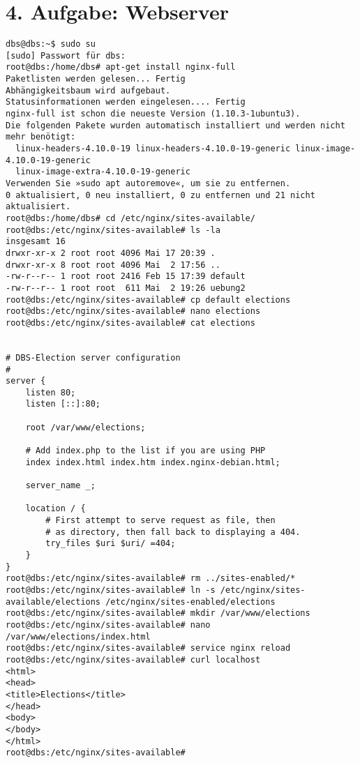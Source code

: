 \documentclass[a4paper]{article}
\begin{document}
\section{4. Aufgabe: Webserver}
\begin{verbatim}
dbs@dbs:~$ sudo su
[sudo] Passwort für dbs: 
root@dbs:/home/dbs# apt-get install nginx-full
Paketlisten werden gelesen... Fertig
Abhängigkeitsbaum wird aufgebaut.       
Statusinformationen werden eingelesen.... Fertig
nginx-full ist schon die neueste Version (1.10.3-1ubuntu3).
Die folgenden Pakete wurden automatisch installiert und werden nicht mehr benötigt:
  linux-headers-4.10.0-19 linux-headers-4.10.0-19-generic linux-image-4.10.0-19-generic
  linux-image-extra-4.10.0-19-generic
Verwenden Sie »sudo apt autoremove«, um sie zu entfernen.
0 aktualisiert, 0 neu installiert, 0 zu entfernen und 21 nicht aktualisiert.
root@dbs:/home/dbs# cd /etc/nginx/sites-available/
root@dbs:/etc/nginx/sites-available# ls -la
insgesamt 16
drwxr-xr-x 2 root root 4096 Mai 17 20:39 .
drwxr-xr-x 8 root root 4096 Mai  2 17:56 ..
-rw-r--r-- 1 root root 2416 Feb 15 17:39 default
-rw-r--r-- 1 root root  611 Mai  2 19:26 uebung2
root@dbs:/etc/nginx/sites-available# cp default elections
root@dbs:/etc/nginx/sites-available# nano elections 
root@dbs:/etc/nginx/sites-available# cat elections 


# DBS-Election server configuration
#
server {
	listen 80;
	listen [::]:80;

	root /var/www/elections;

	# Add index.php to the list if you are using PHP
	index index.html index.htm index.nginx-debian.html;

	server_name _;

	location / {
		# First attempt to serve request as file, then
		# as directory, then fall back to displaying a 404.
		try_files $uri $uri/ =404;
	}
}
root@dbs:/etc/nginx/sites-available# rm ../sites-enabled/*
root@dbs:/etc/nginx/sites-available# ln -s /etc/nginx/sites-available/elections /etc/nginx/sites-enabled/elections
root@dbs:/etc/nginx/sites-available# mkdir /var/www/elections
root@dbs:/etc/nginx/sites-available# nano /var/www/elections/index.html
root@dbs:/etc/nginx/sites-available# service nginx reload
root@dbs:/etc/nginx/sites-available# curl localhost
<html>
<head>
<title>Elections</title>
</head>
<body>
</body>
</html>
root@dbs:/etc/nginx/sites-available# 

\end{verbatim}
\end{document}
